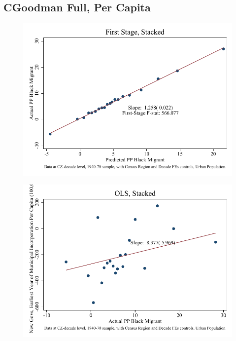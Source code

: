 \documentclass{article}
\begin{document}
\subsection{CGoodman Full, Per Capita}

\clearpage
\begin{figure}
\centering
\includegraphics{figures/simplefigs/stacked_cgoodman_pc_C3_urban_fs.pdf}
\end{figure}
\clearpage
\begin{figure}
\centering
\includegraphics{figures/simplefigs/stacked_cgoodman_pc_C3_urban_ols.pdf}
\end{figure}
\clearpage
\end{document}
